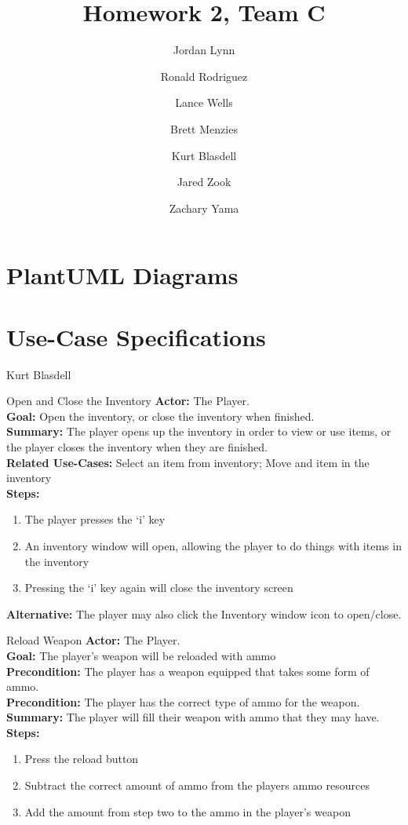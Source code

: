\documentclass[12pt]{report}
\title{Homework 2, Team C}
\author{ Jordan Lynn 
\and Ronald Rodriguez 
\and Lance Wells 
\and Brett Menzies 
\and Kurt Blasdell 
\and Jared Zook 
\and Zachary Yama
\and
}
\begin{document}
    \maketitle

\tableofcontents{}

\chapter{PlantUML Diagrams}

\chapter{Use-Case Specifications}


\begin{section}{Kurt Blasdell}
\begin{subsection}{Open and Close the Inventory}
\textbf{Actor:} The Player. \\
\textbf{Goal:} Open the inventory, or close the inventory when finished. \\
\textbf{Summary:} The player opens up the inventory in order to view or use items, or the player closes the inventory when they are finished. \\
\textbf{Related Use-Cases:} Select an item from inventory; Move and item in the inventory \\
\textbf{Steps:}
\begin{enumerate}
	\item The player presses the ‘i’ key
	\item An inventory window will open, allowing the player to do things with items in the inventory
	\item Pressing the ‘i’ key again will close the inventory screen
\end{enumerate}
\textbf{Alternative:} The player may also click the Inventory window icon to open/close.
\end{subsection}

\begin{subsection}{Reload Weapon}
\textbf{Actor:} The Player. \\
\textbf{Goal:} The player’s weapon will be reloaded with ammo \\
\textbf{Precondition:} The player has a weapon equipped that takes some form of ammo. \\
\textbf{Precondition:} The player has the correct type of ammo for the weapon. \\
\textbf{Summary:} The player will fill their weapon with ammo that they may have. \\
\textbf{Steps:}
\begin{enumerate}
	\item Press the reload button
	\item Subtract the correct amount of ammo from the players ammo resources
	\item Add the amount from step two to the ammo in the player’s weapon
\end{enumerate}
\end{subsection}


\end{section}
\end{document}
